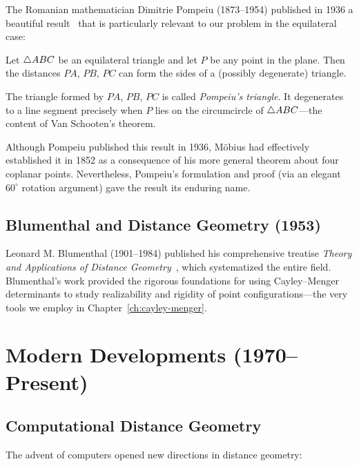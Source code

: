 The Romanian mathematician Dimitrie Pompeiu (1873--1954) published in 1936 a beautiful result~\citep{pompeiu1936} that is particularly relevant to our problem in the equilateral case:

\begin{theorem}
\label{thm:pompeiu-hist}
Let $\triangle ABC$ be an equilateral triangle and let $P$ be any point in the plane. Then the distances $PA$, $PB$, $PC$ can form the sides of a (possibly degenerate) triangle.
\end{theorem}

The triangle formed by $PA$, $PB$, $PC$ is called \emph{Pompeiu's triangle}. It degenerates to a line segment precisely when $P$ lies on the circumcircle of $\triangle ABC$---the content of Van Schooten's theorem.

Although Pompeiu published this result in 1936, M\"obius had effectively established it in 1852 as a consequence of his more general theorem about four coplanar points. Nevertheless, Pompeiu's formulation and proof (via an elegant $60^\circ$ rotation argument) gave the result its enduring name.

\subsection{Blumenthal and Distance Geometry (1953)}

Leonard M. Blumenthal (1901--1984) published his comprehensive treatise \emph{Theory and Applications of Distance Geometry}~\citep{blumenthal1953}, which systematized the entire field. Blumenthal's work provided the rigorous foundations for using Cayley--Menger determinants to study realizability and rigidity of point configurations---the very tools we employ in Chapter~\ref{ch:cayley-menger}.

\section{Modern Developments (1970--Present)}

\subsection{Computational Distance Geometry}

The advent of computers opened new directions in distance geometry:

